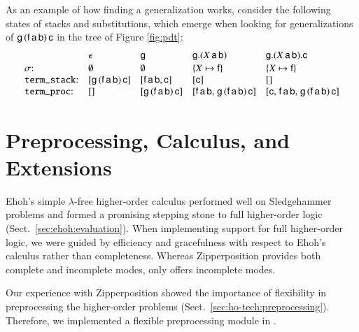 As an example of how finding a generalization works, consider the following
states of stacks and substitutions, which emerge when looking for generalizations of 
$\mathsf{g} \, (\mathsf{f} \, \mathsf{a} \, \mathsf{b}) \, \mathsf{c}$ in the tree of Figure \ref{fig:pdt}:
%
\[\begin{array}{@{}l@{\kern1em}l@{\kern1em}l@{\kern1em}l@{\kern1em}l@{}}
             & \epsilon                                                & \cst{g}                                                 & \cst{g}.(X \, \cst{a} \, \cst{b})                                                          & \cst{g}.(X \, \cst{a} \, \cst{b}).\cst{c} \\[.5\jot]
  \sigma{:}  & \emptyset                                               & \emptyset                                               & \{X \mapsto \cst{f}\}                                                                      & \{X \mapsto \cst{f}\} \\
  \tstack{:} & [\cst{g} \, (\cst{f} \, \cst{a} \, \cst{b}) \, \cst{c}] & [\cst{f} \, \cst{a} \, \cst{b}, \cst{c}]                & [\cst{c}]                                                                                  & [] \\
  \tproc{:}  & []                                                      & [\cst{g} \, (\cst{f} \, \cst{a} \, \cst{b}) \, \cst{c}] & [\cst{f} \, \cst{a} \, \cst{b}{,}\; \cst{g} \, (\cst{f} \, \cst{a} \, \cst{b}) \, \cst{c}] & [\cst{c}{,}\;\cst{f} \, \cst{a} \, \cst{b}{,}\; \cst{g} \, (\cst{f} \, \cst{a} \, \cst{b}) \, \cst{c}]
  \end{array}\]

  \section{Preprocessing, Calculus, and Extensions}
  \label{sec:ehoh2:calculus}
  
  Ehoh's simple $\lambda$-free higher-order calculus performed well on
  Sledgehammer problems and formed a promising stepping stone to full higher-order
  logic (Sect.~\ref{sec:ehoh:evaluation}). When implementing support for full higher-order
  logic, we were guided by efficiency and gracefulness with respect to Ehoh's calculus rather
  than completeness. Whereas Zipperposition provides both complete and incomplete
  modes, \ehohii{} only offers incomplete modes.
  
   Our experience with Zipperposition showed the importance
  of flexibility in preprocessing the higher-order problems
  (Sect.~\ref{sec:ho-tech:preprocessing}). Therefore, we implemented a flexible
  preprocessing module in \ehohii{}. 
  
